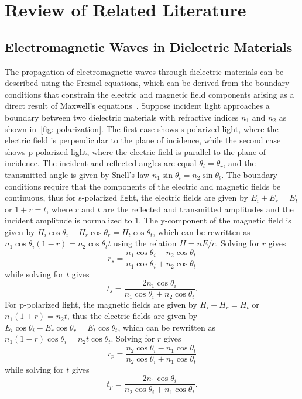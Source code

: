 \chapter{Review of Related Literature}\label{cha: literature-review}
\section{Electromagnetic Waves in Dielectric Materials}\label{sec: EM waves}
The propagation of electromagnetic waves through dielectric materials can be described using the Fresnel equations, which can be derived from the boundary conditions that constrain the electric and magnetic field components arising as a direct result of Max\-well's equations~\cite{rochfordPolarizationPolarimetry2002, lyashenkoCrystalOptics2005}. 
Suppose incident light approaches a boundary between two dielectric materials with refractive indices $n_1$ and $n_2$ as shown in~\ref{fig: polarization}. The first case shows s-polarized light, where the electric field is perpendicular to the plane of incidence, while the second case shows p-polarized light, where the electric field is parallel to the plane of incidence. The incident and reflected angles are equal $\theta_i = \theta_r$, and the transmitted angle is given by Snell's law $n_1\sin \theta_i = n_2 \sin \theta_t$. The boundary conditions require that the components of the electric and magnetic fields be continuous, thus for s-polarized light, the electric fields are given by $E_i + E_r = E_t$ or $1 + r = t$, where $r$ and $t$ are the reflected and transmitted amplitudes and the incident amplitude is normalized to $1$. The y-component of the magnetic field is given by $H_i \cos \theta_i - H_r \cos \theta_r = H_t \cos \theta_t$, which can be rewritten as $n_1 \cos \theta_i (1 - r) = n_2 \cos \theta_t t$ using the relation $H = n E / c$. Solving for $r$ gives 
\begin{equation} \label{eqn: reflection_s-polarized}
		r_s = \frac{n_1 \cos \theta_i - n_2 \cos \theta_t}{n_1 \cos \theta_i + n_2 \cos \theta_t}
\end{equation}
while solving for $t$ gives
\begin{equation} \label{eqn: transmission_s-polarized}
		t_s = \frac{2 n_1 \cos \theta_i}{n_1 \cos \theta_i + n_2 \cos \theta_t}.
\end{equation}
For p-polarized light, the magnetic fields are given by $H_i + H_r = H_t$ or $n_1 (1 + r) = n_2 t$, thus the electric fields are given by $E_i \cos \theta_i - E_r \cos \theta_r = E_t \cos \theta_t$, which can be rewritten as $n_1 (1 - r) \cos \theta_i = n_2 t \cos \theta_t$. Solving for $r$ gives
\begin{equation} \label{eqn: reflection_p-polarized}
		r_p = \frac{n_2 \cos \theta_i - n_1 \cos \theta_t}{n_2 \cos \theta_i + n_1 \cos \theta_t}
\end{equation}
while solving for $t$ gives
\begin{equation} \label{eqn: transmission_p-polarized}
		t_p = \frac{2 n_1 \cos \theta_i}{n_2 \cos \theta_i + n_1 \cos \theta_t}.
\end{equation}

